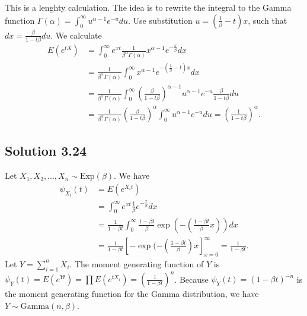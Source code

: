 \begin{itemize}
        This is a lenghty calculation.
        The idea is to rewrite the integral to the Gamma function $\Gamma(\alpha) = \int_0^{\infty} u^{\alpha - 1} e^{-u} du$.
        Use substitution $u = (\frac{1}{\beta} - t)x$, such that $dx = \frac{\beta}{1 - t\beta} du$.
        We calculate
        \begin{equation*}
            \begin{split}
                E(e^{tX})
                    &= \int_0^{\infty} e^{xt} \frac{1}{\beta^{\alpha} \Gamma(\alpha)} x^{\alpha - 1} e^{-\frac{x}{\beta}} dx \\
                    &= \frac{1}{\beta^{\alpha} \Gamma(\alpha)} \int_0^{\infty} x^{\alpha - 1} e^{-(\frac{1}{\beta} - t)x} dx \\
                    &= \frac{1}{\beta^{\alpha} \Gamma(\alpha)} \int_0^{\infty} \left(\frac{\beta}{1 - t\beta}\right)^{\alpha - 1} u^{\alpha - 1} e^{-u} \frac{\beta}{1 - t\beta} du \\
                    &= \frac{1}{\beta^{\alpha} \Gamma(\alpha)} \left(\frac{\beta}{1 - t\beta}\right)^{\alpha} \int_0^{\infty} u^{\alpha - 1}e^{-u} du
                    = \left( \frac{1}{1 - t\beta} \right)^{\alpha}.
            \end{split}
        \end{equation*}
\end{itemize}


\subsection*{Solution 3.24}

Let $X_1, X_2, ..., X_n \sim \mathrm{Exp}(\beta)$.
We have
\begin{equation*}
    \begin{split}
        \psi_{X_i}(t) &= E(e^{X_i t}) \\
            &= \int_0^{\infty} e^{xt} \frac{1}{\beta} e^{-\frac{x}{\beta}} dx \\
            &= \frac{1}{1 - \beta t} \int_0^{\infty} \frac{1 - \beta t}{\beta} \exp\left( -\left(\frac{1 - \beta t}{\beta} x \right)\right) dx \\
            &= \frac{1}{1 - \beta t} \left[ -\exp( -\left(\frac{1 - \beta t}{\beta}\right) x\right]_{x = 0}^{\infty}
            = \frac{1}{1 - \beta t}.
    \end{split}
\end{equation*}
Let $Y = \sum_{i = 1}^n X_i$.
The moment generating function of $Y$ is $\psi_Y(t) = E(e^{Y t}) = \prod E(e^{t X_i}) = \left( \frac{1}{1 - \beta t} \right)^n$.
Because $\psi_Y(t) = (1 - \beta t)^{-n}$ is the moment generating function for the Gamma distribution, we have $Y \sim \mathrm{Gamma}(n, \beta)$.
